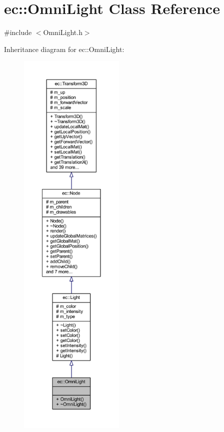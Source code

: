 \hypertarget{classec_1_1_omni_light}{}\section{ec\+:\+:Omni\+Light Class Reference}
\label{classec_1_1_omni_light}


{\ttfamily \#include $<$Omni\+Light.\+h$>$}



Inheritance diagram for ec\+:\+:Omni\+Light\+:\nopagebreak
\begin{figure}[H]
\begin{center}
\leavevmode
\includegraphics[height=550pt]{classec_1_1_omni_light__inherit__graph}
\end{center}
\end{figure}


